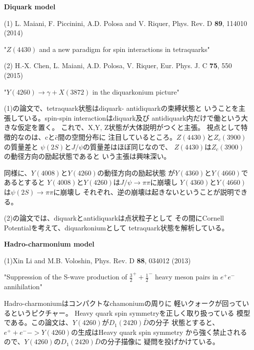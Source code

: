 \documentclass[a4j]{jarticle}
\begin{document}
\par
\vspace*{5mm}
{\bf \large Diquark model}

(1) L. Maiani, F. Piccinini, A.D. Polosa and V. Riquer, Phys. Rev. D {\bf 89}, 114010 (2014)

"$Z(4430)$ and a new paradigm for spin interactions in tetraquarks"

\vspace{5mm}
(2) H.-X. Chen, L. Maiani, A.D. Polosa, V. Riquer, Eur. Phys. J. C {\bf 75}, 550 (2015)

"$Y(4260) \to \gamma + X(3872)$ in the diquarkonium picture"

\vspace{5mm}
(1)の論文で、tetraquark状態はdiquark- antidiquarkの束縛状態と
いうことを主張している。spin-spin interactionはdiquark及び
antidiquark内だけで働という大きな仮定を置く。
これで、X,Y, Z状態が大体説明がつくと主張。
視点として特徴的なのは、cと$\bar c$間の空間分布に
注目しているところ。$Z(4430)$と$Z_c(3900)$の質量差と
$\psi(2S)$と$J/\psi$の質量差はほぼ同じなので、
$Z(4430)$は$Z_c(3900)$の動径方向の励起状態であると
いう主張は興味深い。

同様に、$Y(4008)$と$Y(4260)$の動径方向の励起状態
が$Y(4360)$と$Y(4660)$であるとすると
$Y(4008)$と$Y(4260)$は$J/\psi \to \pi \pi$に崩壊し
$Y(4360)$と$Y(4660)$は$\psi(2S) \to \pi \pi$に崩壊し
それぞれ、逆の崩壊は起きないということが説明できる。

\vspace{5mm}
(2)の論文では、diquarkとantidiquarkは点状粒子として
その間にCornell Potentialを考えて、diquarkoniumとして
tetraquark状態を解析している。

\vspace{10mm}
{\bf \large Hadro-charmonium model}

(1)Xin Li and M.B. Voloshin, Phys. Rev. D {\bf 88}, 034012 (2013)

"Suppression of the S-wave production of $\frac{3}{2}^+ + \frac{1}{2}^-$ heavy 
meson pairs in $e^+ e^-$ annihilation"

\vspace{5mm}

Hadro-charmoniumはコンパクトなchamoniumの周りに
軽いクォークが回っているというピクチャー。
Heavy quark spin symmetryを正しく取り扱っている
模型である。この論文は、$Y(4260)$が$D_1(2420) \bar D$の分子
状態とすると、$e^+ + e^- -> Y(4260)$の生成はHeavy quark spin symmetry
から強く禁止されるので、$Y(4260)$の$D_1(2420) \bar D$の分子描像に
疑問を投げかけている。
\end{document}
